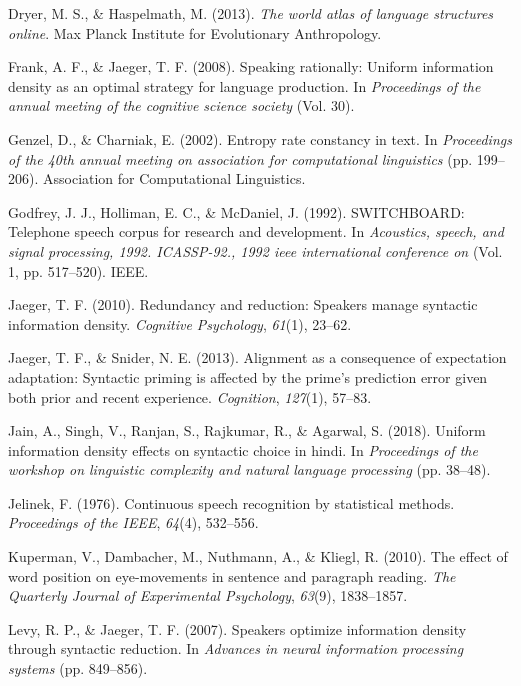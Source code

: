 \documentclass[10pt, letterpaper]{article}
\begin{document}
\leavevmode\hypertarget{ref-dryer2013}{}%
Dryer, M. S., \& Haspelmath, M. (2013). \emph{The world atlas of
language structures online}. Max Planck Institute for Evolutionary
Anthropology.

\leavevmode\hypertarget{ref-frank2008}{}%
Frank, A. F., \& Jaeger, T. F. (2008). Speaking rationally: Uniform
information density as an optimal strategy for language production. In
\emph{Proceedings of the annual meeting of the cognitive science
society} (Vol. 30).

\leavevmode\hypertarget{ref-genzel2002}{}%
Genzel, D., \& Charniak, E. (2002). Entropy rate constancy in text. In
\emph{Proceedings of the 40th annual meeting on association for
computational linguistics} (pp. 199--206). Association for Computational
Linguistics.

\leavevmode\hypertarget{ref-godfrey1992}{}%
Godfrey, J. J., Holliman, E. C., \& McDaniel, J. (1992). SWITCHBOARD:
Telephone speech corpus for research and development. In
\emph{Acoustics, speech, and signal processing, 1992. ICASSP-92., 1992
ieee international conference on} (Vol. 1, pp. 517--520). IEEE.

\leavevmode\hypertarget{ref-jaeger2010}{}%
Jaeger, T. F. (2010). Redundancy and reduction: Speakers manage
syntactic information density. \emph{Cognitive Psychology},
\emph{61}(1), 23--62.

\leavevmode\hypertarget{ref-jaeger2013}{}%
Jaeger, T. F., \& Snider, N. E. (2013). Alignment as a consequence of
expectation adaptation: Syntactic priming is affected by the prime's
prediction error given both prior and recent experience.
\emph{Cognition}, \emph{127}(1), 57--83.

\leavevmode\hypertarget{ref-jain2018}{}%
Jain, A., Singh, V., Ranjan, S., Rajkumar, R., \& Agarwal, S. (2018).
Uniform information density effects on syntactic choice in hindi. In
\emph{Proceedings of the workshop on linguistic complexity and natural
language processing} (pp. 38--48).

\leavevmode\hypertarget{ref-jelinek1976}{}%
Jelinek, F. (1976). Continuous speech recognition by statistical
methods. \emph{Proceedings of the IEEE}, \emph{64}(4), 532--556.

\leavevmode\hypertarget{ref-kuperman2010}{}%
Kuperman, V., Dambacher, M., Nuthmann, A., \& Kliegl, R. (2010). The
effect of word position on eye-movements in sentence and paragraph
reading. \emph{The Quarterly Journal of Experimental Psychology},
\emph{63}(9), 1838--1857.

\leavevmode\hypertarget{ref-levy2007}{}%
Levy, R. P., \& Jaeger, T. F. (2007). Speakers optimize information
density through syntactic reduction. In \emph{Advances in neural
information processing systems} (pp. 849--856).
\end{document}
